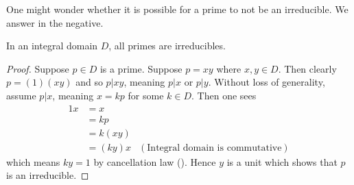 One might wonder whether it is possible for a prime to not be an irreducible. We answer in the negative.

\begin{theorem}\label{thrm-in-integral-domain-primes-are-irreducibles}
    In an integral domain $D$, all primes are irreducibles.
\end{theorem}
\begin{proof}
    Suppose $p \in D$ is a prime. Suppose $p = xy$ where $x, y\in D$. Then clearly $p = (1)(xy)$ and so $p \vert xy$, meaning $p \vert x$ or $p \vert y$. Without loss of generality, assume $p \vert x$, meaning $x = kp$ for some $k \in D$. Then one sees
    \begin{align*}
        1x &= x\\
        &= kp\\
        &= k(xy)\\
        &= (ky)x & (\text{Integral domain is commutative})
    \end{align*}
    which means $ky = 1$ by cancellation law (). Hence $y$ is a unit which shows that $p$ is an irreducible.
\end{proof}

